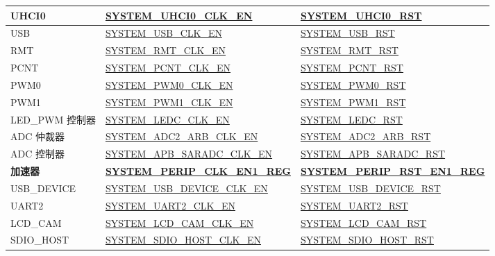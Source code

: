 \documentclass[main\_\_CN.tex]{subfiles}
\begin{document}
\begin{longtable}[c]{ |p{4cm}|p{6cm}|p{6cm}| }
UHCI0    & \hyperref[fielddesc:SYSTEMUHCI0CLKEN]{SYSTEM\_UHCI0\_CLK\_EN} & \hyperref[fielddesc:SYSTEMUHCI0RST]{SYSTEM\_UHCI0\_RST} \\\hline
USB    & \hyperref[fielddesc:SYSTEMUSBCLKEN]{SYSTEM\_USB\_CLK\_EN} & \hyperref[fielddesc:SYSTEMUSBRST]{SYSTEM\_USB\_RST} \\\hline
RMT    & \hyperref[fielddesc:SYSTEMRMTCLKEN]{SYSTEM\_RMT\_CLK\_EN} & \hyperref[fielddesc:SYSTEMRMTRST]{SYSTEM\_RMT\_RST} \\\hline
PCNT    & \hyperref[fielddesc:SYSTEMPCNTCLKEN]{SYSTEM\_PCNT\_CLK\_EN} & \hyperref[fielddesc:SYSTEMPCNTRST]{SYSTEM\_PCNT\_RST} \\\hline
PWM0    & \hyperref[fielddesc:SYSTEMPWM0CLKEN]{SYSTEM\_PWM0\_CLK\_EN} & \hyperref[fielddesc:SYSTEMPWM0RST]{SYSTEM\_PWM0\_RST} \\\hline
PWM1    & \hyperref[fielddesc:SYSTEMPWM1CLKEN]{SYSTEM\_PWM1\_CLK\_EN} & \hyperref[fielddesc:SYSTEMPWM1RST]{SYSTEM\_PWM1\_RST} \\\hline
LED\_PWM 控制器    & \hyperref[fielddesc:SYSTEMLEDCCLKEN]{SYSTEM\_LEDC\_CLK\_EN} & \hyperref[fielddesc:SYSTEMLEDCRST]{SYSTEM\_LEDC\_RST} \\\hline
ADC 仲裁器   & \hyperref[fielddesc:SYSTEMADC2ARBCLKEN]{SYSTEM\_ADC2\_ARB\_CLK\_EN} & \hyperref[fielddesc:SYSTEMADC2ARBRST]{SYSTEM\_ADC2\_ARB\_RST} \\\hline
ADC 控制器    & \hyperref[fielddesc:SYSTEMAPBSARADCCLKEN]{SYSTEM\_APB\_SARADC\_CLK\_EN} & \hyperref[fielddesc:SYSTEMAPBSARADCRST]{SYSTEM\_APB\_SARADC\_RST} \\\hline
\textbf{加速器} & \textbf{\hyperref[regdesc:SYSTEMPERIPCLKEN1REG]{SYSTEM\_PERIP\_CLK\_EN1\_REG}} & \textbf{\hyperref[regdesc:SYSTEMPERIPRSTEN1REG]{SYSTEM\_PERIP\_RST\_EN1\_REG}} \\ \hline
USB\_DEVICE & \hyperref[fielddesc:SYSTEMUSBDEVICECLKEN]{SYSTEM\_USB\_DEVICE\_CLK\_EN} & \hyperref[fielddesc:SYSTEMUSBDEVICERST]{SYSTEM\_USB\_DEVICE\_RST} \\\hline
UART2 & \hyperref[fielddesc:SYSTEMUART2CLKEN]{SYSTEM\_UART2\_CLK\_EN} & \hyperref[fielddesc:SYSTEMUART2RST]{SYSTEM\_UART2\_RST} \\\hline
LCD\_CAM & \hyperref[fielddesc:SYSTEMLCDCAMCLKEN]{SYSTEM\_LCD\_CAM\_CLK\_EN} & \hyperref[fielddesc:SYSTEMLCDCAMRST]{SYSTEM\_LCD\_CAM\_RST} \\\hline
SDIO\_HOST & \hyperref[fielddesc:SYSTEMSDIOHOSTCLKEN]{SYSTEM\_SDIO\_HOST\_CLK\_EN} & \hyperref[fielddesc:SYSTEMSDIOHOSTRST]{SYSTEM\_SDIO\_HOST\_RST} \\\hline

\end{longtable}
\end{document}
